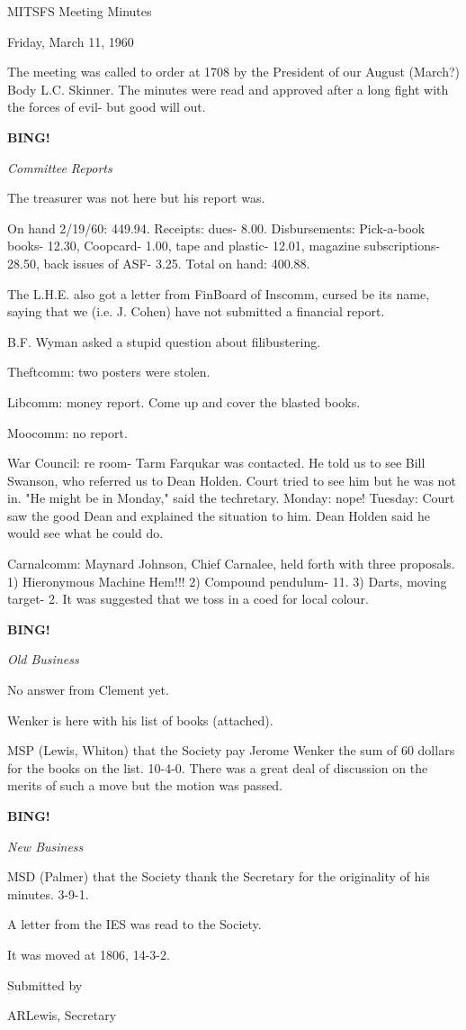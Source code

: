 \documentclass[12pt]{article}
\newcommand{\bing}{{\bf BING!} }
\newcommand{\goto}[1]{\bing \vskip 12pt \centerline{{\em{#1}}}}
\begin{document}
\begin{center}

MITSFS Meeting Minutes

Friday, March 11, 1960

\end{center}
 
\vspace{12pt}

\setlength{\parskip}{6pt}

\noindent
The meeting was called to order at 1708 by the President of our August (March?) Body L.C. Skinner. The minutes were read and approved after a long fight with the forces of evil- but good will out.

\goto{Committee Reports}

The treasurer was not here but his report was.

On hand 2/19/60: 449.94. Receipts: dues- 8.00. Disbursements: Pick-a-book books- 12.30, Coopcard- 1.00, tape and plastic- 12.01, magazine subscriptions- 28.50, back issues of ASF- 3.25. Total on hand: 400.88.

The L.H.E. also got a letter from FinBoard of Inscomm, cursed be its name, saying that we (i.e. J. Cohen) have not submitted a financial report.

B.F. Wyman asked a stupid question about filibustering.

Theftcomm: two posters were stolen.

Libcomm: money report. Come up and cover the blasted books.

Moocomm: no report.

War Council: re room- Tarm Farqukar was contacted. He told us to see Bill Swanson, who referred us to Dean Holden. Court tried to see him but he was not in. "He might be in Monday," said the techretary. Monday: nope! Tuesday: Court saw the good Dean and explained the situation to him. Dean Holden said he would see what he could do.

Carnalcomm: Maynard Johnson, Chief Carnalee, held forth with three proposals. 1) Hieronymous Machine Hem!!! 2) Compound pendulum- 11. 3) Darts, moving target- 2. It was suggested that we toss in a coed for local colour.

\goto{Old Business}

No answer from Clement yet.

Wenker is here with his list of books (attached).

MSP (Lewis, Whiton) that the Society pay Jerome Wenker the sum of 60 dollars for the books on the list. 10-4-0. There was a great deal of discussion on the merits of such a move but the motion was passed.

\goto{New Business}

MSD (Palmer) that the Society thank the Secretary for the originality of his minutes. 3-9-1.

A letter from the IES was read to the Society.

It was moved at 1806, 14-3-2.

\vspace{12pt}

\centerline{Submitted by}
\centerline{ARLewis, Secretary}
\end{document}
